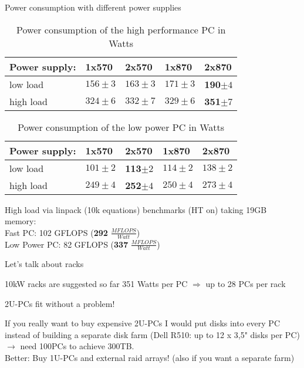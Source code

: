 \begin{frame}{Power consumption with different power supplies}{}
	\begin{table}
	\begin{tabular}{lllll} 
	Power supply:	&	1x570 	&	2x570 	& 1x870	&	2x870\\ 
	\hline 
	low load	&	$156 \pm 3$		& $163 \pm 3$		& $171 \pm 3$	& \textbf{190}$ \pm 4$\\ 
	high load	&	$324 \pm 6$		& $332 \pm 7$		& $329 \pm 6$	& \textbf{351}$ \pm	7$
	\end{tabular} 
	\caption{Power consumption of the high performance PC in Watts}
	\end{table}	
	\begin{table}
	\begin{tabular}{lllll}
	Power supply:	&	1x570 	&	2x570 	& 1x870	&	2x870\\
	\hline
	low	load	&	$101 \pm 2$		& \textbf{113}$ \pm 2$		& $114 \pm 2$	& $138 \pm 2$ \\
	high load	&	$249 \pm 4$		& \textbf{252}$ \pm 4$		& $250 \pm 4$	& $273 \pm 4$
	\end{tabular}
	\caption{Power consumption of the low power PC in Watts}
	\end{table}
	High load via linpack (10k equations) benchmarks (HT on) taking 19GB memory:\\
	Fast PC: 102 GFLOPS (\textbf{292} $\frac{MFLOPS}{Watt}$) \\ 
	Low Power PC: 82 GFLOPS (\textbf{337} $\frac{MFLOPS}{Watt}$)
\end{frame}

\begin{frame}{Let's talk about racks}{}
	\begin{block}{10kW racks are suggested so far}
		351 Watts per PC $\Rightarrow$ up to 28 PCs per rack \\
		\begin{ergo}
			2U-PCs fit without a problem!
		\end{ergo}
	\end{block}
	If you really want to buy expensive 2U-PCs I would put disks into every PC
	instead of building a separate disk farm (Dell R510: up to 12 x 3,5" disks per
	PC) $\rightarrow$ need 100PCs to achieve 300TB. 
\\
	Better: Buy 1U-PCs and external raid arrays! (also if you want a separate farm) 
	
\end{frame}



